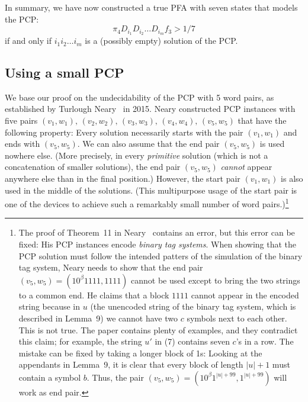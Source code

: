 \documentclass[a4paper,cleveref, autoref, thm-restate]{lipics-v2021}
\begin{document}
In summary, we have now constructed a true PFA with seven states that models the PCP:
\begin{equation}
  \label{eq:D2}
  \pi_4D_{i_1}D_{i_2} \ldots D_{i_m}f_3 >1/7
\end{equation}
if and only if
$i_1i_2 \ldots i_m$ is a (possibly empty) solution of the PCP.

\subsection{Using a small PCP}
\label{sec:select-PCP}

We base our proof on the undecidability of the PCP with 5 word pairs, as
established by Turlough Neary~\cite[Theorem~11]{neary:PCP5:2015} in 2015.
Neary constructed PCP instances with five pairs
$(v_1,w_1),\,(v_2,w_2),\,(v_3,w_3),\,(v_4,w_4),\,(v_5,w_5)$
that have the following property:
Every solution necessarily starts with the pair
$(v_1,w_1)$ and ends with
$(v_5,w_5)$.
We can also assume that
the end pair $(v_5,w_5)$ is used nowhere else.
(More precisely, in every \emph{primitive} solution (which is not a
concatenation of smaller solutions),
the end pair $(v_5,w_5)$ \emph{cannot} appear anywhere else than in
the final position.)
However, the
start pair
$(v_1,w_1)$ is also used in the middle of the solutions.
(This multipurpose usage of the
start pair is one of the devices to achieve such a remarkably small number of
word pairs.)\footnote
{The proof of Theorem~11
in Neary~\cite{neary:PCP5:2015}
contains an error, but this error can be fixed:
His PCP instances encode \emph{binary tag systems}.
 When showing that the PCP solution must
 follow the intended patters of the simulation of the binary tag system,
 Neary \cite[p.~660]{neary:PCP5:2015}
needs to show that the end pair $(v_5,w_5)=
(10^\beta1111,1111)$ cannot be used except to bring the two strings to
a common end. He
 claims that
 a block $1111$ cannot appear in the encoded string because in $u$
(the unencoded string of the binary tag system, which is described in Lemma~9)
 we
cannot have two
$c$ symbols
next to each other.
This is not true. The paper contains plenty of examples,
and they
contradict this claim; for example, the string $u'$ in (7)
\cite[p.~657]{neary:PCP5:2015} contains seven $c$'s in a row.
The mistake can be fixed by taking a longer block of 1s:
Looking at the appendants in Lemma~9, it is clear that every block of
length $|u|+1$ must contain a symbol $b$. Thus, the %
pair
$(v_5,w_5)=
(10^\beta1^{|u|+99},1^{|u|+99})$ will work as end pair.
}
\end{document}
